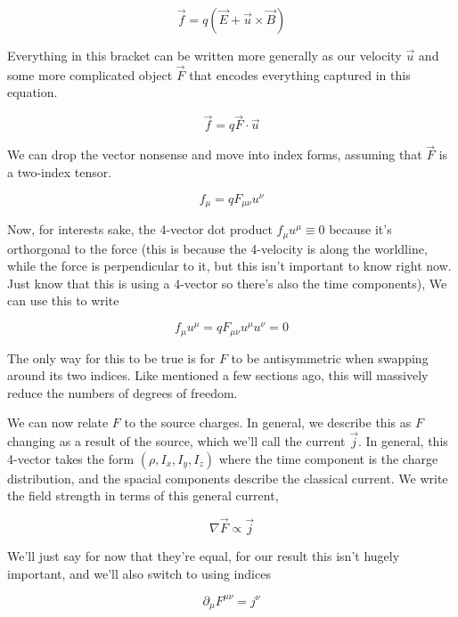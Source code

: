 \documentclass{article}
\begin{document}
\begin{equation}
    \vec{f} = q(\vec{E} + \vec{u} \times \vec{B})
\end{equation}

Everything in this bracket can be written more generally as our velocity $\vec{u}$ and some more complicated object $\vec{F}$ that encodes everything captured in this equation.

\begin{equation}
    \vec{f} = q\vec{F}\cdot\vec{u}
\end{equation}

We can drop the vector nonsense and move into index forms, assuming that $\vec{F}$ is a two-index tensor.

\begin{equation}
    f_\mu = q F_{\mu\nu}u^\nu
\end{equation}

Now, for interests sake, the 4-vector dot product $f_\mu u^\mu \equiv 0$ because it's orthorgonal to the force (this is because the 4-velocity is along the worldline, while the force is perpendicular to it, but this isn't important to know right now. Just know that this is using a 4-vector so there's also the time components), We can use this to write

\begin{equation}
    f_\mu u^\mu = q F_{\mu\nu}u^\mu u^\nu = 0
\end{equation}

The only way for this to be true is for $F$ to be antisymmetric when swapping around its two indices. Like mentioned a few sections ago, this will massively reduce the numbers of degrees of freedom.

We can now relate $F$ to the source charges. In general, we describe this as $F$ changing as a result of the source, which we'll call the current $\vec{j}$. In general, this 4-vector takes the form $(\rho,I_x,I_y,I_z)$ where the time component is the charge distribution, and the spacial components describe the classical current. We write the field strength in terms of this general current,

\begin{equation}
    \nabla \vec{F} \propto \vec{j}
\end{equation}

We'll just say for now that they're equal, for our result this isn't hugely important, and we'll also switch to using indices

\begin{equation}
    \partial_\mu F^{\mu\nu} = j^\nu
\end{equation}
\end{document}
